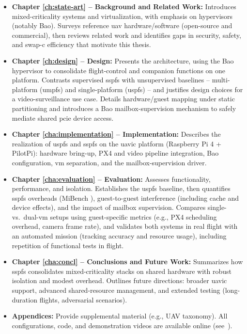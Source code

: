 \begin{itemize}
\item
\textbf{Chapter \ref{ch:state-art} -- Background and Related Work:}
Introduces mixed-criticality systems and virtualization, with emphasis on
hypervisors (notably Bao). Surveys reference \gls{uav} hardware/software
(open-source and commercial), then reviews related work and identifies gaps in
security, safety, and \gls{swap-c} efficiency that motivate this thesis.

\item
\textbf{Chapter \ref{ch:design} -- Design:}
Presents the  architecture, using the Bao hypervisor to
consolidate flight-control and companion functions on one platform. Contrasts
supervised \gls{sspfs} with unsupervised baselines -- multi-platform
(\gls{umpfs}) and single-platform (\gls{uspfs}) -- and justifies design choices
for a video-surveillance use case. Details hardware/guest mapping under static
partitioning and introduces a Bao mailbox-supervision mechanism to safely
mediate shared \gls{pcie} device access.

\item
\textbf{Chapter \ref{cha:implementation} -- Implementation:}
Describes the realization of \gls{uspfs} and \gls{sspfs} on the \gls{uavic}
platform (Raspberry Pi 4 + PilotPi): hardware bring-up, PX4 and video pipeline
integration, Bao configuration, \gls{vm} separation, and the mailbox-supervision
driver.

\item
\textbf{Chapter \ref{cha:evaluation} -- Evaluation:}
Assesses functionality, performance, and isolation. Establishes the \gls{uspfs}
baseline, then quantifies \gls{sspfs} overheads (MiBench ),
guest-to-guest interference (including cache and device effects), and the impact
of mailbox supervision. Compares single- vs.\ dual-\gls{vm} setups using
guest-specific metrics (e.g., PX4 scheduling overhead, camera frame rate), and
validates both systems in real flight with an automated mission (tracking
accuracy and resource usage), including repetition of functional tests in
flight.

\item
\textbf{Chapter \ref{cha:concl} -- Conclusions and Future Work:}
Summarizes how \gls{sspfs} consolidates mixed-criticality stacks on shared
hardware with robust isolation and modest overhead. Outlines future directions:
broader \gls{uavic} support, advanced shared-resource management, and extended
testing (long-duration flights, adversarial scenarios).

\item
\textbf{Appendices:}
Provide supplemental material (e.g., UAV taxonomy). All configurations, code,
and demonstration videos are available online (see~\cite{thesis-sw-github}).
\end{itemize}



